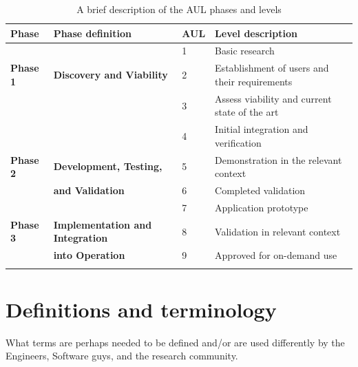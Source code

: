 \documentclass[referee,a4paper,12pt,traditabstract]{swsc}
\begin{document}
\begin{linenumbers}
\begin{table}
\caption{A brief description of the AUL phases and levels}
\centering
\begin{tabular}{llll}\hline
Phase & Phase definition & AUL & Level description \\
 \hline
 & & \textcolor{CASIIaliceblue}{1}& \textcolor{CASIIaliceblue}{Basic research}\\
 \textcolor{CASIIaliceblue}{{\bf Phase 1} }& \textcolor{CASIIaliceblue}{{\bf Discovery and Viability }} & \textcolor{CASIIaliceblue}{2} & \textcolor{CASIIaliceblue}{Establishment of users and their requirements}\\ 
& & \textcolor{CASIIaliceblue}{3} &\textcolor{CASIIaliceblue}{Assess viability and current state of the art} \\
 \hline
 \hline
 & & \textcolor{CASIIdarkgreen}{4}& \textcolor{CASIIdarkgreen}{Initial integration and verification}\\
 \textcolor{CASIIdarkgreen}{{\bf Phase 2} }& \textcolor{CASIIdarkgreen}{{\bf Development, Testing,  }} & \textcolor{CASIIdarkgreen}{5} & \textcolor{CASIIdarkgreen}{Demonstration in the relevant context}\\ 
& \textcolor{CASIIdarkgreen}{{\bf and Validation}}& \textcolor{CASIIdarkgreen}{6} &\textcolor{CASIIdarkgreen}{Completed validation} \\
 \hline 
 \hline
 & & \textcolor{CASIIdarkyellow}{{7}}& \textcolor{CASIIdarkyellow}{{Application prototype}}\\
 \textcolor{CASIIdarkyellow}{{{\bf Phase 3}}}& \textcolor{CASIIdarkyellow}{{{\bf Implementation and Integration}}} & \textcolor{CASIIdarkyellow}{{8}} & \textcolor{CASIIdarkyellow}{{Validation in relevant context}}\\ 
& \textcolor{CASIIdarkyellow}{{{\bf into Operation}}} & \textcolor{CASIIdarkyellow}{{9}} &\textcolor{CASIIdarkyellow}{{Approved for on-demand use}} \\


\label{Tab_AUL}
\end{tabular}
\end{table}


\section{Definitions and terminology}

What terms are perhaps needed to be defined and/or are used differently by the Engineers, Software guys, and the research community. 



\end{linenumbers}
\end{document}
